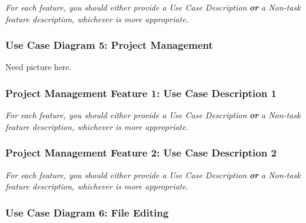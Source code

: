 \documentclass[twoside,letterpaper]{article}
\begin{document}
{\color{black}
	\foreignlanguage{english}{\textit{For each feature, you should either provide a Use Case Description
		}}\foreignlanguage{english}{\textbf{\textit{or}}}\foreignlanguage{english}{\textit{ a Non-task feature description,
		whichever is more appropriate.}}}
\newpage

\subsubsection[Use Case Diagram 5: Project Management]{\rmfamily\bfseries\color{black}
	Use Case Diagram 5: Project Management}

Need picture here.

\newpage

\subsubsection[Project Management Feature 1: Use Case Description 1]{\rmfamily\bfseries\color{black}
	Project Management Feature 1: Use Case Description 1}
\hypertarget{RefHeading22059017292}{}
\bigskip

{\color{black}
	\foreignlanguage{english}{\textit{For each feature, you should either provide a Use Case Description
		}}\foreignlanguage{english}{\textbf{\textit{or}}}\foreignlanguage{english}{\textit{ a Non-task feature description,
		whichever is more appropriate.}}}
\newpage

\subsubsection[Project Management Feature 2: Use Case Description 2]{\rmfamily\bfseries\color{black}
	Project Management Feature 2: Use Case Description 2}
\hypertarget{RefHeading22059017292}{}
\bigskip

{\color{black}
	\foreignlanguage{english}{\textit{For each feature, you should either provide a Use Case Description
		}}\foreignlanguage{english}{\textbf{\textit{or}}}\foreignlanguage{english}{\textit{ a Non-task feature description,
		whichever is more appropriate.}}}
\newpage

\subsubsection[Use Case Diagram 6: File Editing]{\rmfamily\bfseries\color{black}
	Use Case Diagram 6: File Editing}
\end{document}
